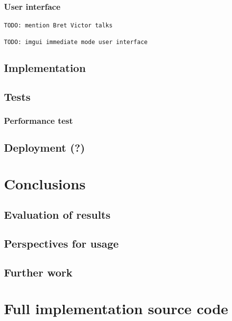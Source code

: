 \documentclass[12pt]{report}
\newcommand{\todo}[1]{}
\renewcommand{\todo}[1]{{\color{red} \par \noindent \footnotesize \texttt{TODO: {#1} }}}
\begin{document}
\subsection{User interface}

\todo{mention Bret Victor talks}
\todo{imgui immediate mode user interface}

\section{Implementation}




\section{Tests} 

\subsection{Performance test}

\section{Deployment (?)} 

\chapter{Conclusions} \label{rozdzial.podsumowanie}

\section{Evaluation of results} 

\section{Perspectives for usage }



\section{Further work}

 
\chapter{Full implementation source code} \label{rozdzial.kod}
\end{document}
